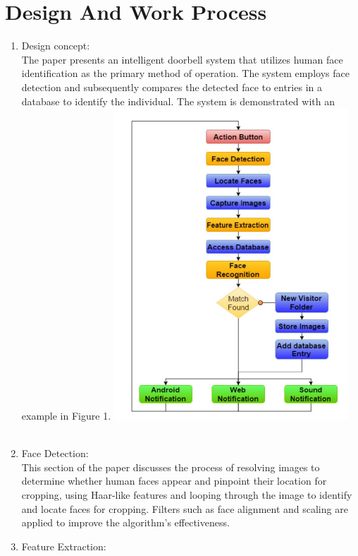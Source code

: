 \documentclass{report}
\begin{document}
\section{Design And Work Process}
\begin{multicols}{1}    
    \begin{enumerate}    
        \item Design concept: \\
        The paper presents an intelligent doorbell system that utilizes human face identification as the primary method of operation. The system employs face detection and subsequently compares the detected face to entries in a database 
        to identify the individual. The system is demonstrated with an example in Figure 1.
        \includegraphics{images/system_procedures.png}\\
        \\
        \item Face Detection: \\
        This section of the paper discusses the process of resolving images to determine whether human faces appear and pinpoint their location for cropping, using Haar-like features and looping through the image to identify and locate faces for cropping. Filters such as face alignment and scaling are applied to improve the algorithm's effectiveness.
        \item Feature Extraction: \\

\end{enumerate}
\end{multicols}
\end{document}
